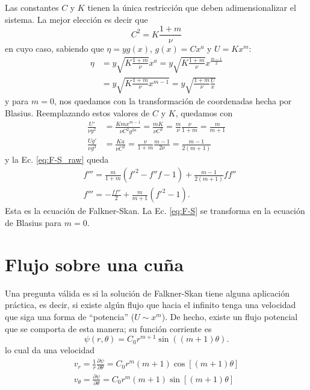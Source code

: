 Las constantes $C$ y $K$ tienen la única restricción que deben adimensionalizar el sistema.
La mejor elección es decir que 
%
\begin{equation}
C^2 = K\frac{1+m}{\nu}
\end{equation}
%
en cuyo caso, sabiendo que $\eta=yg(x)$, $g(x)=Cx^a$ y $U=Kx^m$:
%
\begin{align}\label{eq:eta_F-S}
\eta &= y\sqrt{K\frac{1+m}{\nu}}x^a = y\sqrt{K\frac{1+m}{\nu}}x^{\frac{m-1}{2}} \nonumber\\
&= y\sqrt{K\frac{1+m}{\nu}x^{m-1}} = y\sqrt{\frac{1+m}{\nu}\frac{U}{x}}
\end{align}
%
y para $m=0$, nos quedamos con la transformación de coordenadas hecha por Blasius.
Reemplazando estos valores de $C$ y $K$, quedamos con
%
\begin{align}
\frac{U'}{\nu g^2} &= \frac{Kmx^{m-1}}{\nu C^2g^{2a}} = \frac{mK}{\nu C^2} = \frac{m}{\nu}\frac{\nu}{1+m} = \frac{m}{m+1}\nonumber\\
\frac{Ug'}{\nu g^3} &= \frac{Ka}{\nu C^2} = \frac{\nu}{1+m}\frac{m-1}{2\nu} = \frac{m-1}{2(m+1)}
\end{align}
%
y la Ec. \eqref{eq:F-S_raw} queda
%
\begin{align}\label{eq:F-S}
&f''' = \frac{m}{1+m}(f'^2-f''f-1)+\frac{m-1}{2(m+1)}ff''\nonumber\\
&f''' = -\frac{ff''}{2} + \frac{m}{m+1}(f'^2-1).
\end{align}
%
Esta es la ecuación de Falkner-Skan.
La Ec. \eqref{eq:F-S} se transforma en la ecuación de Blasius para $m=0$. 

\section*{Flujo sobre una cuña}
Una pregunta válida es si la solución de Falkner-Skan tiene alguna aplicación práctica, es decir, si existe algún flujo que hacia el infinito tenga una velocidad que siga una forma de ``potencia'' ($U\sim x^m$).
De hecho, existe un flujo potencial que se comporta de esta manera; su función corriente es
%
\begin{equation}
\psi(r,\theta) = C_0 r^{m+1}\sin((m+1)\theta).
\end{equation}
%
lo cual da una velocidad
%
\begin{align}
v_r = \frac{1}{r}\frac{\partial\psi}{\partial\theta} = C_0 r^m(m+1)\cos[(m+1)\theta] \nonumber\\
v_\theta = \frac{\partial\psi}{\partial\theta} = C_0 r^m(m+1)\sin[(m+1)\theta]
\end{align}

